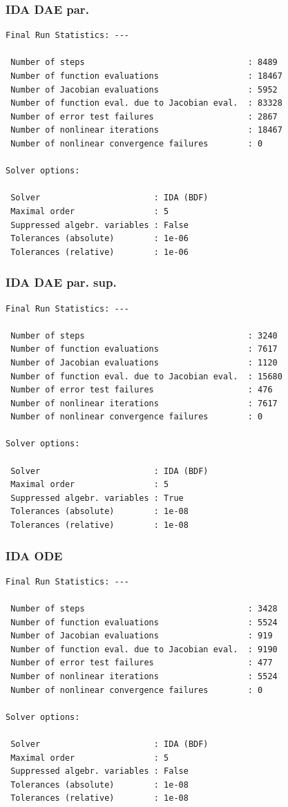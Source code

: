 \documentclass[]{beamer}
\begin{document}
\begin{frame}[fragile]
\frametitle{IDA DAE par.}
{\small
\begin{verbatim}
Final Run Statistics: --- 

 Number of steps                                 : 8489
 Number of function evaluations                  : 18467
 Number of Jacobian evaluations                  : 5952
 Number of function eval. due to Jacobian eval.  : 83328
 Number of error test failures                   : 2867
 Number of nonlinear iterations                  : 18467
 Number of nonlinear convergence failures        : 0

Solver options:

 Solver                       : IDA (BDF)
 Maximal order                : 5
 Suppressed algebr. variables : False
 Tolerances (absolute)        : 1e-06
 Tolerances (relative)        : 1e-06
\end{verbatim}
}
\end{frame}

\begin{frame}[fragile]
\frametitle{IDA DAE par. sup.}
{\small
\begin{verbatim}
Final Run Statistics: --- 

 Number of steps                                 : 3240
 Number of function evaluations                  : 7617
 Number of Jacobian evaluations                  : 1120
 Number of function eval. due to Jacobian eval.  : 15680
 Number of error test failures                   : 476
 Number of nonlinear iterations                  : 7617
 Number of nonlinear convergence failures        : 0

Solver options:

 Solver                       : IDA (BDF)
 Maximal order                : 5
 Suppressed algebr. variables : True
 Tolerances (absolute)        : 1e-08
 Tolerances (relative)        : 1e-08
\end{verbatim}
}
\end{frame}

\begin{frame}[fragile]
\frametitle{IDA ODE}
{\small
\begin{verbatim}
Final Run Statistics: --- 

 Number of steps                                 : 3428
 Number of function evaluations                  : 5524
 Number of Jacobian evaluations                  : 919
 Number of function eval. due to Jacobian eval.  : 9190
 Number of error test failures                   : 477
 Number of nonlinear iterations                  : 5524
 Number of nonlinear convergence failures        : 0

Solver options:

 Solver                       : IDA (BDF)
 Maximal order                : 5
 Suppressed algebr. variables : False
 Tolerances (absolute)        : 1e-08
 Tolerances (relative)        : 1e-08
\end{verbatim}
}
\end{frame}
\end{document}

